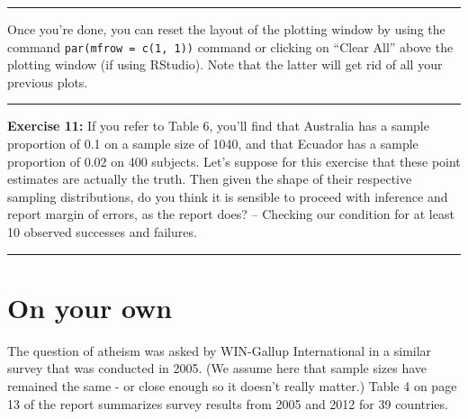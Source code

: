 \documentclass[]{book}
\theoremstyle{definition}
\theoremstyle{definition}
\theoremstyle{definition}
\theoremstyle{remark}
\begin{document}
\begin{center}\rule{0.5\linewidth}{\linethickness}\end{center}

Once you're done, you can reset the layout of the plotting window by
using the command \texttt{par(mfrow\ =\ c(1,\ 1))} command or clicking
on ``Clear All'' above the plotting window (if using RStudio). Note that
the latter will get rid of all your previous plots.

\begin{center}\rule{0.5\linewidth}{\linethickness}\end{center}

\textbf{Exercise 11:} If you refer to Table 6, you'll find that
Australia has a sample proportion of 0.1 on a sample size of 1040, and
that Ecuador has a sample proportion of 0.02 on 400 subjects. Let's
suppose for this exercise that these point estimates are actually the
truth. Then given the shape of their respective sampling distributions,
do you think it is sensible to proceed with inference and report margin
of errors, as the report does? -- Checking our condition for at least 10
observed successes and failures.

\begin{center}\rule{0.5\linewidth}{\linethickness}\end{center}

\section{On your own}\label{on-your-own-6}

The question of atheism was asked by WIN-Gallup International in a
similar survey that was conducted in 2005. (We assume here that sample
sizes have remained the same - or close enough so it doesn't really
matter.) Table 4 on page 13 of the report summarizes survey results from
2005 and 2012 for 39 countries.
\end{document}
